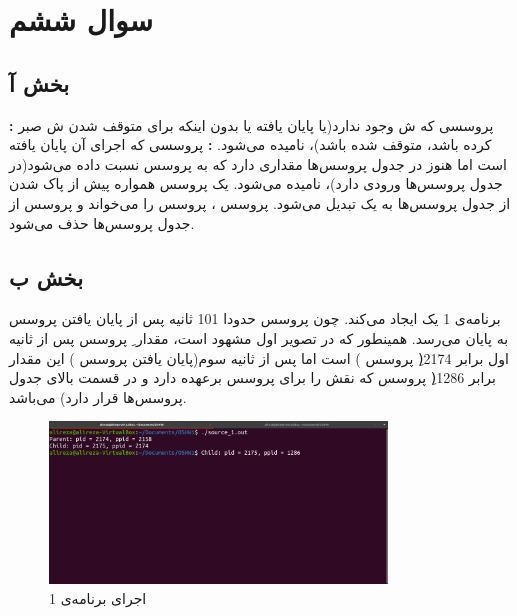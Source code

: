 \documentclass{article}
\begin{document}
\subsection{}
\lr{}

\section{سوال ششم}
\subsection{بخش آ}
\textbf{:}
پروسسی که ش وجود ندارد(یا پایان یافته یا بدون اینکه برای متوقف شدن ش صبر کرده باشد، متوقف شده باشد)،  نامیده می‌شود.
\newline
\textbf{:}
پروسسی که اجرای آن پایان یافته است اما هنوز در جدول پروسس‌ها مقداری دارد که به پروسس  نسبت داده می‌شود(در جدول پروسس‌ها ورودی دارد)،  نامیده می‌شود. یک پروسس  همواره پیش از پاک شدن از جدول پروسس‌ها به یک  تبدیل می‌شود. پروسس ،  پروسس  را می‌خواند و پروسس  از جدول پروسس‌ها حذف می‌شود.
\subsection{بخش ب}
\indent
برنامه‌ی 1 یک  ایجاد می‌کند. چون پروسس  حدودا 101 ثانیه پس از پایان یافتن پروسس  به پایان می‌رسد. همینطور که در تصویر اول مشهود است، مقدار ِ پروسس  پس از ثانیه اول برابر 2174(ِ پروسس ) است اما پس از ثانیه سوم(پایان یافتن پروسس ) این مقدار برابر 1286(ِ پروسس  که نقش  را برای پروسس  برعهده دارد و در قسمت بالای جدول پروسس‌ها قرار دارد) می‌باشد.
\begin{figure}[H]
    \centering
    \includegraphics[width=0.8\textwidth]{figures/6.2.1.1.png}
    \caption{اجرای برنامه‌ی 1}
    \label{fig:fig1}
\end{figure}
\end{document}
